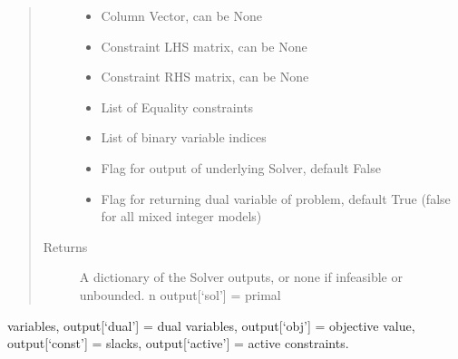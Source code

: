 \documentclass[letterpaper,10pt,english]{sphinxmanual}
\begin{document}
\begin{fulllineitems}
\begin{quote}
\begin{description}
\begin{itemize}
\item {} 
\sphinxAtStartPar
{} \textendash{} Column Vector, can be None

\item {} 
\sphinxAtStartPar
{} \textendash{} Constraint LHS matrix, can be None

\item {} 
\sphinxAtStartPar
{} \textendash{} Constraint RHS matrix, can be None

\item {} 
\sphinxAtStartPar
{} \textendash{} List of Equality constraints

\item {} 
\sphinxAtStartPar
{} \textendash{} List of binary variable indices

\item {} 
\sphinxAtStartPar
{} \textendash{} Flag for output of underlying Solver, default False

\item {} 
\sphinxAtStartPar
{} \textendash{} Flag for returning dual variable of problem, default True (false for all mixed integer models)

\end{itemize}

\item[{Returns}] \leavevmode
\sphinxAtStartPar
A dictionary of the Solver outputs, or none if infeasible or unbounded. n output{[}‘sol’{]} = primal

\end{description}\end{quote}

\sphinxAtStartPar
variables, output{[}‘dual’{]} = dual variables, output{[}‘obj’{]} = objective value, output{[}‘const’{]} = slacks,
output{[}‘active’{]} = active constraints.

\end{fulllineitems}

\end{document}
